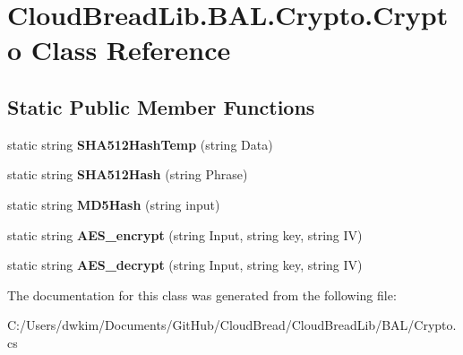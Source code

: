 \hypertarget{a00072}{}\section{Cloud\+Bread\+Lib.\+B\+A\+L.\+Crypto.\+Crypto Class Reference}
\label{a00072}
\subsection*{Static Public Member Functions}
\begin{DoxyCompactItemize}
\item 
static string {\bfseries S\+H\+A512\+Hash\+Temp} (string Data)\hypertarget{a00072_a9e3bcd89fcf615211a3b130da12f303b}{}\label{a00072_a9e3bcd89fcf615211a3b130da12f303b}

\item 
static string {\bfseries S\+H\+A512\+Hash} (string Phrase)\hypertarget{a00072_a8fdf4f7ed36ccc7c4f06c24694be91a1}{}\label{a00072_a8fdf4f7ed36ccc7c4f06c24694be91a1}

\item 
static string {\bfseries M\+D5\+Hash} (string input)\hypertarget{a00072_a12caf024bb8996c2808bfc4885a9c9d4}{}\label{a00072_a12caf024bb8996c2808bfc4885a9c9d4}

\item 
static string {\bfseries A\+E\+S\+\_\+encrypt} (string Input, string key, string IV)\hypertarget{a00072_ae26608c3c151fe4b37af07553248156f}{}\label{a00072_ae26608c3c151fe4b37af07553248156f}

\item 
static string {\bfseries A\+E\+S\+\_\+decrypt} (string Input, string key, string IV)\hypertarget{a00072_a325a57ed3041b30afbe1f484f92d38be}{}\label{a00072_a325a57ed3041b30afbe1f484f92d38be}

\end{DoxyCompactItemize}


The documentation for this class was generated from the following file\+:\begin{DoxyCompactItemize}
\item 
C\+:/\+Users/dwkim/\+Documents/\+Git\+Hub/\+Cloud\+Bread/\+Cloud\+Bread\+Lib/\+B\+A\+L/Crypto.\+cs\end{DoxyCompactItemize}
